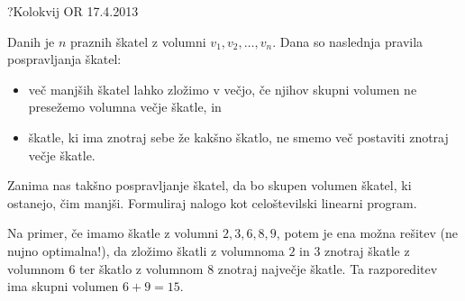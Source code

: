\begin{naloga}{?}{Kolokvij OR 17.4.2013}
\begin{vprasanje}
Danih je $n$ praznih škatel z volumni $v_1, v_2, \dots, v_n$.
Dana so naslednja pravila pospravljanja škatel:
\begin{itemize}
\item več manjših škatel lahko zložimo v večjo,
če njihov skupni volumen ne presežemo volumna večje škatle, in
\item škatle, ki ima znotraj sebe že kakšno škatlo,
ne smemo več postaviti znotraj večje škatle.
\end{itemize}
Zanima nas takšno pospravljanje škatel,
da bo skupen volumen škatel, ki ostanejo, čim manjši.
Formuliraj nalogo kot celoštevilski linearni program.

Na primer, če imamo škatle z volumni $2, 3, 6, 8, 9$,
potem je ena možna rešitev (ne nujno optimalna!),
da zložimo škatli z volumnoma $2$ in $3$ znotraj škatle z volumnom $6$
ter škatlo z volumnom $8$ znotraj največje škatle.
Ta razporeditev ima skupni volumen $6 + 9 = 15$.
\end{vprasanje}
\begin{odgovor}
\end{odgovor}
\end{naloga}


